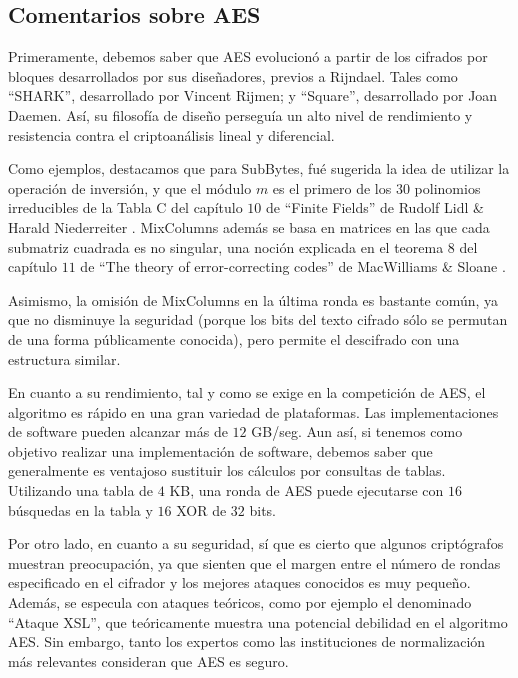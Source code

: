     \subsection{Comentarios sobre AES}
    
    Primeramente, debemos saber que AES evolucionó a partir de los cifrados por bloques desarrollados por sus diseñadores, previos a Rijndael. Tales como ``SHARK'', desarrollado por Vincent Rijmen; y ``Square'', desarrollado por Joan Daemen. Así, su filosofía de diseño perseguía un alto nivel de rendimiento y resistencia contra el criptoanálisis lineal y diferencial.

    Como ejemplos, destacamos que para SubBytes, fué sugerida la idea de utilizar la operación de inversión, y que el módulo $m$ es el primero de los $30$ polinomios irreducibles de la Tabla C del capítulo $10$ de ``Finite Fields'' de Rudolf Lidl \& Harald Niederreiter \cite{artLidl}. MixColumns además se basa en matrices en las que cada submatriz cuadrada es no singular, una noción explicada en el teorema $8$ del capítulo $11$ de ``The theory of error-correcting codes'' de MacWilliams \& Sloane \cite{artMacSlo}.

    Asimismo, la omisión de MixColumns en la última ronda es bastante común, ya que no disminuye la seguridad (porque los bits del texto cifrado sólo se permutan de una forma públicamente conocida), pero permite el descifrado con una estructura similar.
    
    En cuanto a su rendimiento, tal y como se exige en la competición de AES, el algoritmo es rápido en una gran variedad de plataformas. Las implementaciones de software pueden alcanzar más de $12$ GB/seg. Aun así, si tenemos como objetivo realizar una implementación de software, debemos saber que generalmente es ventajoso sustituir los cálculos por consultas de tablas. Utilizando una tabla de $4$ KB, una ronda de AES puede ejecutarse con $16$ búsquedas en la tabla y $16$ XOR de $32$ bits.

    Por otro lado, en cuanto a su seguridad, sí que es cierto que algunos criptógrafos muestran preocupación, ya que sienten que el margen entre el número de rondas especificado en el cifrador y los mejores ataques conocidos es muy pequeño. Además, se especula con ataques teóricos, como por ejemplo el denominado ``Ataque XSL'', que teóricamente muestra una potencial debilidad en el algoritmo AES. Sin embargo, tanto los expertos como las instituciones de normalización más relevantes consideran que AES es seguro.

